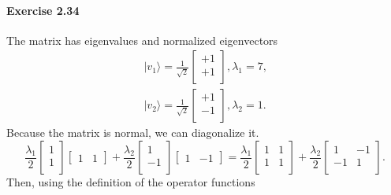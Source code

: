 \documentclass[a4paper,12pt]{article}
\newcommand{\exercise}[1]{\paragraph{Exercise #1}}
\newcommand{\ra}{\rangle}
\begin{document}
    \exercise{2.34} The matrix has eigenvalues and normalized eigenvectors
    \begin{gather}
        \nonumber
        | v_1 \ra = \frac{1}{\sqrt{2}}
        \begin{bmatrix}
            +1\\
            +1\\
        \end{bmatrix}, \lambda_1 = 7 \textrm{,}\\
        | v_2 \ra = \frac{1}{\sqrt{2}}
        \begin{bmatrix}
            +1\\
            -1\\
        \end{bmatrix}, \lambda_2 = 1 \textrm{.}
    \end{gather}
    Because the matrix is normal, we can diagonalize it.
    \begin{equation}
        \frac{\lambda_1}{2}
        \begin{bmatrix}
            1\\
            1\\
        \end{bmatrix}
        \begin{bmatrix}
            1 & 1
        \end{bmatrix}
        +
        \frac{\lambda_2}{2}
        \begin{bmatrix}
            1\\
            -1\\
        \end{bmatrix}
        \begin{bmatrix}
            1 & -1
        \end{bmatrix}
        =
        \frac{\lambda_1}{2}
        \begin{bmatrix}
            1 & 1 \\
            1 & 1 \\
        \end{bmatrix}
        +
        \frac{\lambda_2}{2}
        \begin{bmatrix}
            1 & -1 \\
            -1 & 1 \\
        \end{bmatrix} \textrm{.}
    \end{equation}
    Then, using the definition of the operator functions
\end{document}
